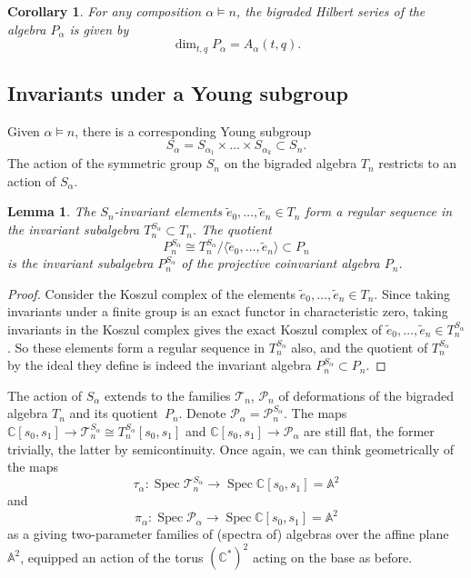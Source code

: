 \documentclass[a4paper,11pt]{amsart}
\theoremstyle{plain}
\newtheorem{lemma}[theorem]{Lemma}
\newtheorem{corollary}[theorem]{Corollary}
\theoremstyle{definition}
\newcommand{\A}{\mathbb{A}}
\newcommand{\C}{\mathbb{C}}
\newcommand{\CP}{\mathscr{P}}
\newcommand{\CT}{\mathcal{T}} %
\newcommand{\pa}{T} %
\DeclareMathOperator{\Spec}{Spec}
\begin{document}
\begin{corollary}\label{cor:Palpha} For any composition $\alpha \vDash n$, the bigraded Hilbert series of the algebra $P_\alpha$ is given by
\[
\dim_{t,q}  P_\alpha=  A_\alpha(t,q).
\]
\end{corollary}

\subsection{Invariants under a Young subgroup} 

Given $\alpha \vDash n$, there is a corresponding Young subgroup 
\[S_\alpha=S_{\alpha_1} \times \ldots \times S_{\alpha_k}\subset S_n.\]
The action of the symmetric group $S_n$ on the bigraded algebra $\pa_n$ restricts to an action of $S_\alpha$. 

\begin{lemma}\label{lem:regseq} The $S_n$-invariant elements $\tilde e_0, \ldots, \tilde e_n\in\pa_n$ form a regular sequence in the invariant subalgebra $\pa_n^{S_\alpha}\subset\pa_n$. The quotient 
\[ P_n^{S_\alpha} \cong \pa_n^{S_\alpha}/\langle \tilde e_0, \ldots, \tilde e_n\rangle\subset P_n
\]
is the invariant subalgebra $P_n^{S_\alpha}$ of the projective coinvariant algebra $P_n$. 
\end{lemma}
\begin{proof} Consider the Koszul complex of the elements $\tilde e_0, \ldots, \tilde e_n\in \pa_n$. 
Since taking invariants under a finite group is an exact functor in characteristic zero, taking invariants in the Koszul complex
gives the exact Koszul complex of $\tilde e_0, \ldots, \tilde e_n\in \pa_n^{S_\alpha}$. So these elements form a regular sequence in $\pa_n^{S_\alpha}$ also, and the quotient of $\pa_n^{S_\alpha}$ by the ideal they define is indeed the invariant algebra $P_n^{S_\alpha}\subset P_n$. 
\end{proof}
The action of $S_\alpha$ extends to the families $\CT_n$, $\CP_n$ of deformations of the bigraded algebra $\pa_n$ and its quotient~$P_n$. Denote $\CP_\alpha = \CP_n^{S_\alpha}$.
The maps $\C[s_0, s_1]\rightarrow \CT_n^{S_\alpha}\cong \pa_n^{S_\alpha}[s_0,s_1]$ and $\C[s_0, s_1]\rightarrow \CP_\alpha$ are still flat, the former trivially, the latter by semicontinuity. Once again, we can think geometrically of the maps \[\tau_\alpha\colon \Spec\CT_n^{S_\alpha}\to \Spec\C[s_0, s_1]=\A^2\] 
and\[\pi_\alpha\colon \Spec\CP_\alpha\to \Spec\C[s_0, s_1]=\A^2\] 
as a giving two-parameter families of (spectra of) algebras over the affine plane $\A^2$, equipped an action of the torus $(\C^*)^2$ acting on the base as before. 
\end{document}
